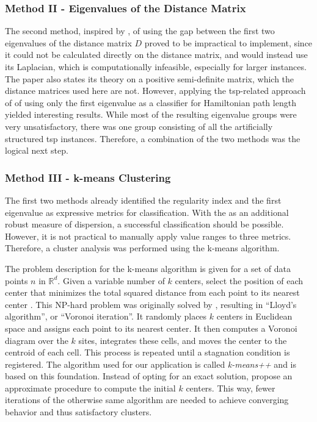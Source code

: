 \subsubsection{Method II - Eigenvalues of the Distance Matrix}

The second method, inspired by \citet{lovasz20071}, of using the gap between the first two eigenvalues of the distance matrix $D$ proved to be impractical to implement, since it could not be calculated directly on the distance matrix, and would instead use its Laplacian, which is computationally infeasible, especially for larger instances. The paper also states its theory on a positive semi-definite matrix, which the distance matrices used here are not. However, applying the \gls{tsp}-related approach of \citet{cvetkovic2018traveling} of using only the first eigenvalue as a classifier for Hamiltonian path length yielded interesting results. While most of the resulting eigenvalue groups were very unsatisfactory, there was one group consisting of all the artificially structured \gls{tsp} instances. Therefore, a combination of the two methods was the logical next step.

\subsubsection{Method III - k-means Clustering }

The first two methods already identified the regularity index and the first eigenvalue as expressive metrics for classification. With the  as an additional robust measure of dispersion, a successful classification should be possible. However, it is not practical to manually apply value ranges to three metrics. Therefore, a cluster analysis was performed using the k-means algorithm. 

The problem description for the k-means algorithm is given for a set of data points $n$ in $\mathbb{R}^d$. Given a variable number of $k$ centers, select the position of each center that minimizes the total squared distance from each point to its nearest center \cite{arthur2006k}. This NP-hard problem was originally solved by \citet{lloyd1982least}, resulting in \enquote{Lloyd's algorithm}, or \enquote{Voronoi iteration}. It randomly places $k$ centers in Euclidean space and assigns each point to its nearest center. It then computes a Voronoi diagram over the $k$ sites, integrates these cells, and moves the center to the centroid of each cell. This process is repeated until a stagnation condition is registered. The algorithm used for our application is called \textit{k-means++} and is based on this foundation. Instead of opting for an exact solution, \citet{arthur2006k} propose an approximate procedure to compute the initial $k$ centers. This way, fewer iterations of the otherwise same algorithm are needed to achieve converging behavior and thus satisfactory clusters. 


